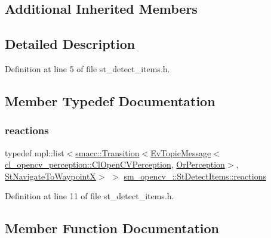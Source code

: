 \subsection*{Additional Inherited Members}


\subsection{Detailed Description}


Definition at line 5 of file st\+\_\+detect\+\_\+items.\+h.



\subsection{Member Typedef Documentation}
\mbox{\label{structsm__opencv__2_1_1StDetectItems_aed8ddb8e7461e292b4f64d3540c24a7c}} 
\subsubsection{\texorpdfstring{reactions}{reactions}}
{\footnotesize\ttfamily typedef mpl\+::list$<$\hyperlink{classsmacc_1_1Transition}{smacc\+::\+Transition}$<$\hyperlink{structsmacc_1_1default__events_1_1EvTopicMessage}{Ev\+Topic\+Message}$<$\hyperlink{classsm__opencv__2_1_1cl__opencv__perception_1_1ClOpenCVPerception}{cl\+\_\+opencv\+\_\+perception\+::\+Cl\+Open\+C\+V\+Perception}, \hyperlink{classsm__opencv__2_1_1OrPerception}{Or\+Perception}$>$, \hyperlink{structsm__opencv__2_1_1StNavigateToWaypointX}{St\+Navigate\+To\+WaypointX}$>$ $>$ \hyperlink{structsm__opencv__2_1_1StDetectItems_aed8ddb8e7461e292b4f64d3540c24a7c}{sm\+\_\+opencv\+\_\+::\+St\+Detect\+Items\+::reactions}}



Definition at line 11 of file st\+\_\+detect\+\_\+items.\+h.



\subsection{Member Function Documentation}
\mbox{\label{structsm__opencv__2_1_1StDetectItems_a7a463d0d107e69ea1e1e77d806218fde}} 
